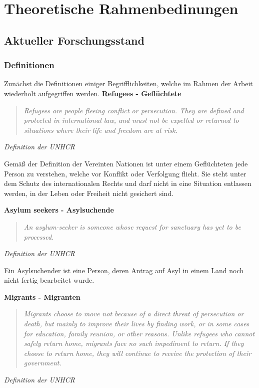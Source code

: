 \section{Theoretische Rahmenbedinungen}

\subsection{Aktueller Forschungsstand}

\subsubsection{Definitionen}

Zunächst die Definitionen einiger Begrifflichkeiten, welche im Rahmen der Arbeit wiederholt aufgegriffen werden.\newline
\newline
\textbf{Refugees - Geflüchtete}

\begin{quote}
    \textit{Refugees are people fleeing conflict or persecution. They are defined and protected in international law, and must not be expelled or returned to situations where their life and freedom are at risk.}\cite{unhcr2017refugees}
\end{quote}
\centerline{\textit{Definition der UNHCR}}

Gemäß der Definition der Vereinten Nationen ist unter einem Geflüchteten jede Person zu verstehen, welche vor Konflikt oder Verfolgung flieht. Sie steht unter dem Schutz des internationalen Rechts und darf nicht in eine Situation entlassen werden, in der Leben oder Freiheit nicht gesichert sind.\newline

\newline
\textbf{Asylum seekers - Asylsuchende}

\begin{quote}
    \textit{An asylum-seeker is someone whose request for sanctuary has yet to be processed.}\cite{unhcr2015asylum}
\end{quote}
\centerline{\textit{Definition der UNHCR}}

Ein Asylsuchender ist eine Person, deren Antrag auf Asyl in einem Land noch nicht fertig bearbeitet wurde.

\newline
\textbf{Migrants - Migranten}

\begin{quote}
    \textit{Migrants choose to move not because of a direct threat of persecution or death, but mainly to improve their lives by finding work, or in some cases for education, family reunion, or other reasons. Unlike refugees who cannot safely return home, migrants face no such impediment to return. If they choose to return home, they will continue to receive the protection of their government.}\cite{unhcr2016migrant}
\end{quote}
\centerline{\textit{Definition der UNHCR}}

